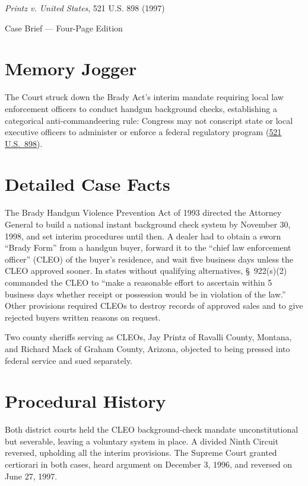 \documentclass[12pt]{article}
\begin{document}
\begin{center}
{\LARGE \textit{Printz v. United States}, 521 U.S. 898 (1997)\par}
\vspace{0.8em}
{\large Case Brief --- Four-Page Edition\par}
\end{center}
\vspace{1em}

\section{Memory Jogger}

The Court struck down the Brady Act's interim mandate requiring local law enforcement officers to conduct handgun background checks, establishing a categorical anti-commandeering rule: Congress may not conscript state or local executive officers to administer or enforce a federal regulatory program (\href{https://www.law.cornell.edu/supct/html/95-1478.ZO.html}{521 U.S.\ 898}).

\section{Detailed Case Facts}

The Brady Handgun Violence Prevention Act of 1993 directed the Attorney General to build a national instant background check system by November 30, 1998, and set interim procedures until then. A dealer had to obtain a sworn ``Brady Form'' from a handgun buyer, forward it to the ``chief law enforcement officer'' (CLEO) of the buyer's residence, and wait five business days unless the CLEO approved sooner. In states without qualifying alternatives, \S\ 922(s)(2) commanded the CLEO to ``make a reasonable effort to ascertain within 5 business days whether receipt or possession would be in violation of the law.'' Other provisions required CLEOs to destroy records of approved sales and to give rejected buyers written reasons on request.

Two county sheriffs serving as CLEOs, Jay Printz of Ravalli County, Montana, and Richard Mack of Graham County, Arizona, objected to being pressed into federal service and sued separately.

\section{Procedural History}

Both district courts held the CLEO background-check mandate unconstitutional but severable, leaving a voluntary system in place. A divided Ninth Circuit reversed, upholding all the interim provisions. The Supreme Court granted certiorari in both cases, heard argument on December 3, 1996, and reversed on June 27, 1997.
\end{document}
